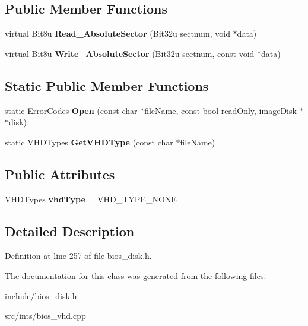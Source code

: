 \subsection*{Public Member Functions}
\begin{DoxyCompactItemize}
\item 
\hypertarget{classimageDiskVHD_a928117145e7f5abd8ff0f151d3d27186}{virtual Bit8u {\bfseries Read\-\_\-\-Absolute\-Sector} (Bit32u sectnum, void $\ast$data)}\label{classimageDiskVHD_a928117145e7f5abd8ff0f151d3d27186}

\item 
\hypertarget{classimageDiskVHD_a86534727d81baae796b45b6a795b73df}{virtual Bit8u {\bfseries Write\-\_\-\-Absolute\-Sector} (Bit32u sectnum, const void $\ast$data)}\label{classimageDiskVHD_a86534727d81baae796b45b6a795b73df}

\end{DoxyCompactItemize}
\subsection*{Static Public Member Functions}
\begin{DoxyCompactItemize}
\item 
\hypertarget{classimageDiskVHD_ad39b474e8066f0de5436fd40a8743f85}{static Error\-Codes {\bfseries Open} (const char $\ast$file\-Name, const bool read\-Only, \hyperlink{classimageDisk}{image\-Disk} $\ast$$\ast$disk)}\label{classimageDiskVHD_ad39b474e8066f0de5436fd40a8743f85}

\item 
\hypertarget{classimageDiskVHD_ac493a1534615d6aa2c3a0cda6dbc9a31}{static V\-H\-D\-Types {\bfseries Get\-V\-H\-D\-Type} (const char $\ast$file\-Name)}\label{classimageDiskVHD_ac493a1534615d6aa2c3a0cda6dbc9a31}

\end{DoxyCompactItemize}
\subsection*{Public Attributes}
\begin{DoxyCompactItemize}
\item 
\hypertarget{classimageDiskVHD_a39c97d47ff1d52756d8cf86fc53e352d}{V\-H\-D\-Types {\bfseries vhd\-Type} = V\-H\-D\-\_\-\-T\-Y\-P\-E\-\_\-\-N\-O\-N\-E}\label{classimageDiskVHD_a39c97d47ff1d52756d8cf86fc53e352d}

\end{DoxyCompactItemize}


\subsection{Detailed Description}


Definition at line 257 of file bios\-\_\-disk.\-h.



The documentation for this class was generated from the following files\-:\begin{DoxyCompactItemize}
\item 
include/bios\-\_\-disk.\-h\item 
src/ints/bios\-\_\-vhd.\-cpp\end{DoxyCompactItemize}
